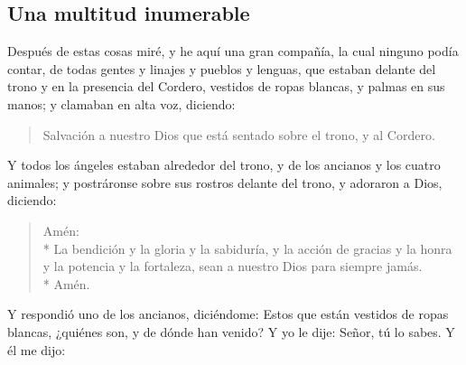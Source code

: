 \subsection*{Una multitud inumerable}
Después de estas cosas miré, y he aquí una gran compañía, la cual ninguno podía contar, de todas gentes y linajes y pueblos y lenguas, que estaban delante del trono y en la presencia del Cordero, vestidos de ropas blancas, y palmas en sus manos; %
y clamaban en alta voz, diciendo:
\begin{verse}
Salvación a nuestro Dios que está sentado sobre el trono, y al Cordero.
\end{verse}
Y todos los ángeles estaban alrededor del trono, y de los ancianos y los cuatro animales; y postráronse sobre sus rostros delante del trono, y adoraron a Dios, %
diciendo:
\begin{verse}
Amén:\\* La bendición y la gloria y la sabiduría, y la acción de gracias y la honra y la potencia y la fortaleza, sean a nuestro Dios para siempre jamás.\\* Amén.
\end{verse}
Y respondió uno de los ancianos, diciéndome: Estos que están vestidos de ropas blancas, ¿quiénes son, y de dónde han venido? %
Y yo le dije: Señor, tú lo sabes.%
 Y él me dijo: 
